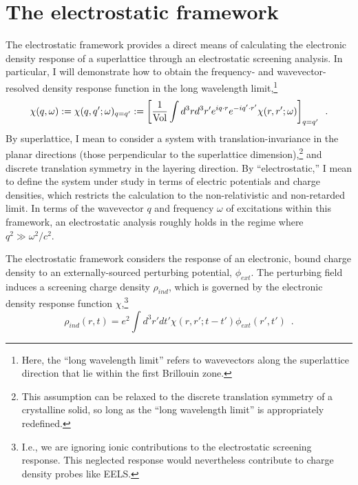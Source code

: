 \section{The electrostatic framework}
\label{section: electrostatic framework}

The electrostatic framework provides a direct means of calculating the electronic density response of a superlattice through an electrostatic screening analysis.  In particular, I will demonstrate how to obtain the frequency- and wavevector-resolved density response function in the long wavelength limit,\footnote{Here, the ``long wavelength limit'' refers to wavevectors along the superlattice direction that lie within the first Brillouin zone.}
\begin{equation}
    \label{Fourier chi}
    \chi(q,\omega):=\chi(q,q';\omega)_{q=q'}
    :=
    \left[\frac{1}{\text{Vol}}\int d^3 r d^3 r' e^{iq\cdot r} e^{-i q'\cdot r'}\chi(r,r';\omega)\right]_{q=q'}
    \,\,\,.
\end{equation}
By superlattice, I mean to consider a system with translation-invariance in the planar directions (those perpendicular to the superlattice dimension),\footnote{This assumption can be relaxed to the discrete translation symmetry of a crystalline solid, so long as the ``long wavelength limit'' is appropriately redefined.} and discrete translation symmetry in the layering direction.  By ``electrostatic,'' I mean to define the system under study in terms of electric potentials and charge densities, which restricts the calculation to the non-relativistic and non-retarded limit.  In terms of the wavevector $q$ and frequency $\omega$ of excitations within this framework, an electrostatic analysis roughly holds in the regime where $q^2\gg \omega^2/c^2$.


The electrostatic framework considers the response of an electronic, bound charge density to an externally-sourced perturbing potential, $\phi_{ext}$.  The perturbing field induces a screening charge density $\rho_{ind}$, which is governed by 
the electronic density response function $\chi$,\footnote{I.e., we are ignoring ionic contributions to the electrostatic screening response.  This neglected response would nevertheless contribute to charge density probes like EELS.}
\begin{equation}
    \label{real space chi def}
    \rho_{ind}(r,t) = e^2\int d^3 r' dt' \chi(r,r';t-t')\phi_{ext}(r',t')
    \,\,\,.
\end{equation}



